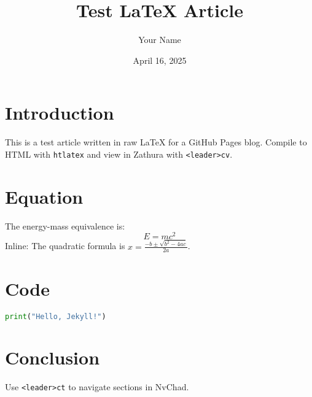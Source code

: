 \documentclass[11pt]{article}
\title{Test LaTeX Article}
\author{Your Name}
\date{April 16, 2025}
\begin{document}
\maketitle

\section{Introduction}
This is a test article written in raw \LaTeX{} for a GitHub Pages blog.
Compile to HTML with \texttt{htlatex} and view in Zathura with \texttt{<leader>cv}.

\section{Equation}
The energy-mass equivalence is:
\begin{equation}
E = mc^2
\end{equation}
Inline: The quadratic formula is \( x = \frac{-b \pm \sqrt{b^2 - 4ac}}{2a} \).

\section{Code}
\begin{lstlisting}[language=Python]
print("Hello, Jekyll!")
\end{lstlisting}

\section{Conclusion}
Use \texttt{<leader>ct} to navigate sections in NvChad.
\end{document}
